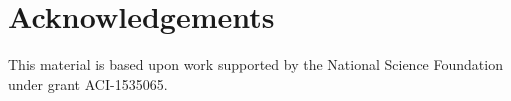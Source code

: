 \documentclass[12pt]{ussci}
\begin{document}
\section{Acknowledgements}
This material is based upon work supported by the National Science Foundation under grant ACI-1535065.




\end{document}
